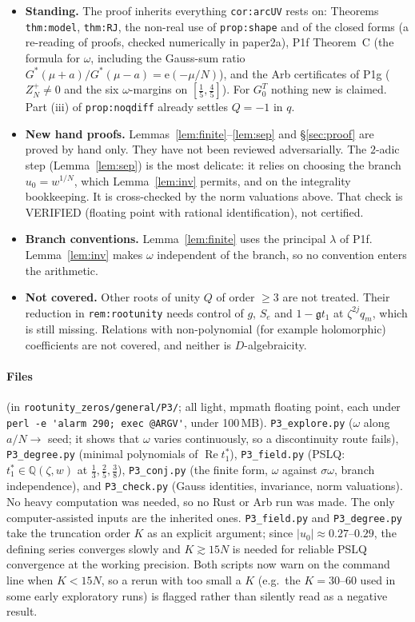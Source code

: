 \documentclass[11pt]{article}
\theoremstyle{remark}
\newcommand{\Q}{\mathbb Q}
\newcommand{\e}{\mathrm e}
\begin{document}
\begin{itemize}
\item \textbf{Standing.} The proof inherits everything \texttt{cor:arcUV} rests on: Theorems
\texttt{thm:model}, \texttt{thm:RJ}, the non-real use of \texttt{prop:shape} and of the closed forms
(a re-reading of proofs, checked numerically in paper2a), P1f Theorem~C (the formula for $\omega$,
including the Gauss-sum ratio $G^\ast(\mu+a)/G^\ast(\mu-a)=\e(-\mu/N)$), and the Arb certificates of
P1g ($Z_N^+\ne0$ and the six $\omega$-margins on $[\frac15,\frac45]$). For $G^T_0$ nothing new is claimed.
Part (iii) of \texttt{prop:noqdiff} already settles $Q=-1$ in $q$.
\item \textbf{New hand proofs.} Lemmas~\ref{lem:finite}--\ref{lem:sep} and \S\ref{sec:proof} are proved by
hand only. They have not been reviewed adversarially. The $2$-adic step (Lemma~\ref{lem:sep}) is the most
delicate: it relies on choosing the branch $u_0=w^{1/N}$, which Lemma~\ref{lem:inv} permits, and on the
integrality bookkeeping. It is cross-checked by the norm valuations above. That check is VERIFIED
(floating point with rational identification), not certified.
\item \textbf{Branch conventions.} Lemma~\ref{lem:finite} uses the principal $\lambda$ of P1f. Lemma~\ref{lem:inv}
makes $\omega$ independent of the branch, so no convention enters the arithmetic.
\item \textbf{Not covered.} Other roots of unity $Q$ of order $\ge3$ are not treated. Their reduction in
\texttt{rem:rootunity} needs control of $g$, $S_e$ and $1-\mathfrak gt_1$ at $\zeta^{2j}q_m$, which is still
missing. Relations with non-polynomial (for example holomorphic) coefficients are not covered, and neither
is $D$-algebraicity.
\end{itemize}

\paragraph{Files} (in \texttt{rootunity\_zeros/general/P3/}; all light, mpmath floating point, each under
\verb|perl -e 'alarm 290; exec @ARGV'|, under 100\,MB). \texttt{P3\_explore.py} ($\omega$ along $a/N\to$ seed;
it shows that $\omega$ varies continuously, so a discontinuity route fails), \texttt{P3\_degree.py}
(minimal polynomials of $\operatorname{Re}t_1^\ast$), \texttt{P3\_field.py} (PSLQ: $t_1^\ast\in\Q(\zeta,w)$ at
$\frac13,\frac25,\frac38$), \texttt{P3\_conj.py} (the finite form, $\omega$ against $\sigma\omega$, branch
independence), and \texttt{P3\_check.py} (Gauss identities, invariance, norm valuations). No heavy
computation was needed, so no Rust or Arb run was made. The only computer-assisted inputs are the inherited ones.
\texttt{P3\_field.py} and \texttt{P3\_degree.py} take the truncation order $K$ as an explicit argument; since
$|u_0|\approx0.27$--$0.29$, the defining series converges slowly and $K\gtrsim15N$ is needed for reliable PSLQ
convergence at the working precision. Both scripts now warn on the command line when $K<15N$, so a rerun with
too small a $K$ (e.g.\ the $K=30$--$60$ used in some early exploratory runs) is flagged rather than silently
read as a negative result.
\end{document}

